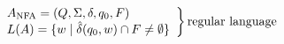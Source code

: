 \vspace{0.5em}
\[\left.
    \begin{array}{l}
    A_{\text{NFA}} = (Q,\Sigma,\delta,q_{0},F)\\
    L(A) = \{w \;|\; \hat{\delta}(q_{0},w) \cap F \neq \emptyset\}
    \end{array}
    \right\} \text{regular language}
\]
